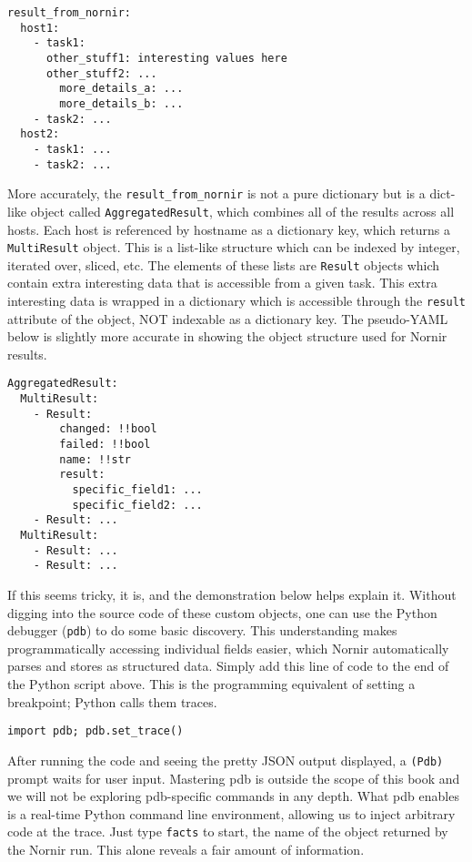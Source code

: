 \begin{verbatim}
result_from_nornir:
  host1:
    - task1:
      other_stuff1: interesting values here
      other_stuff2: ...
        more_details_a: ...
        more_details_b: ...
    - task2: ...
  host2:
    - task1: ...
    - task2: ...
\end{verbatim}

More accurately, the \verb|result_from_nornir| is not a pure dictionary but is
a dict-like object called \verb|AggregatedResult|, which combines all of the
results across all hosts. Each host is referenced by hostname as a dictionary
key, which returns a \verb|MultiResult| object. This is a list-like structure
which can be indexed by integer, iterated over, sliced, etc. The elements of
these lists are \verb|Result| objects which contain extra interesting data
that is accessible from a given task. This extra interesting data is
wrapped in a dictionary which is accessible through the \verb|result|
attribute of the object, NOT indexable as a dictionary key. The pseudo-YAML
below is slightly more accurate in showing the object structure used for
Nornir results.

\begin{verbatim}
AggregatedResult:
  MultiResult:
    - Result:
        changed: !!bool
        failed: !!bool
        name: !!str
        result:
          specific_field1: ...
          specific_field2: ...
    - Result: ...
  MultiResult:
    - Result: ...
    - Result: ...
\end{verbatim}

If this seems tricky, it is, and the demonstration below helps explain it.
Without digging into the source code of these custom objects, one can use the
Python debugger (\verb|pdb|) to do some basic discovery. This understanding
makes programmatically accessing individual fields easier, which Nornir
automatically parses and stores as structured data. Simply add this line of
code to the end of the Python script above. This is the programming equivalent
of setting a breakpoint; Python calls them traces.

\begin{verbatim}
import pdb; pdb.set_trace()
\end{verbatim}

After running the code and seeing the pretty JSON output displayed, a \verb|(Pdb)|
prompt waits for user input. Mastering pdb is outside the scope of this book
and we will not be exploring pdb-specific commands in any depth. What pdb
enables is a real-time Python command line environment, allowing us to inject
arbitrary code at the trace. Just type \verb|facts| to start, the name
of the object returned by the Nornir run. This alone reveals a fair amount of
information.

